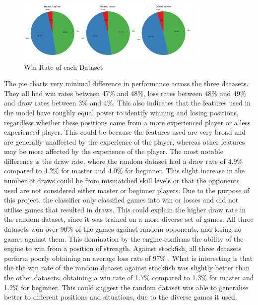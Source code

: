 

\begin{figure}
    \centering
    \includegraphics[width=0.8\textwidth]{images/plots/dataset/Dataset_vs_win_rate_pie.png}
    \caption{Win Rate of each Dataset}
    \label{fig: dataset_vs_win_rate_pie}
\end{figure}

The pie charts very minimal difference in performance across the three datasets. They all had win rates between 47\% and 48\%, loss rates between 48\% and 49\% and draw rates between 3\% and 4\%. This also indicates that the features used in the model have roughly equal power to identify winning and losing positions, regardless whether these positions came from a more experienced player or a less experienced player. This could be because the features used are very broad and are generally unaffected by the experience of the player, whereas other features may be more affected by the experience of the player. The most notable difference is the draw rate, where the random dataset had a draw rate of 4.9\% compared to 4.2\% for master and 4.0\% for beginner. This slight increase in the number of draws could be from mismatched skill levels or that the opponents used are not considered either master or beginner players. Due to the purpose of this project, the classifier only classified games into win or losses and did not utilise games that resulted in draws. This could explain the higher draw rate in the random dataset, since it was trained on a more diverse set of games. All three datasets won over 90\% of the games against random opponents, and losing no games against them. This domination by the engine confirms the ability of the engine to win from a position of strength. Against stockfish, all three datasets perform poorly obtaining an average loss rate of 97\% . What is interesting is that the the win rate of the random dataset against stockfish was slightly better than the other datasets, obtaining a win rate of 1.7\% compared to 1.3\% for master and 1.2\% for beginner. This could suggest the random dataset was able to generalise better to different positions and situations, due to the diverse games it used.

